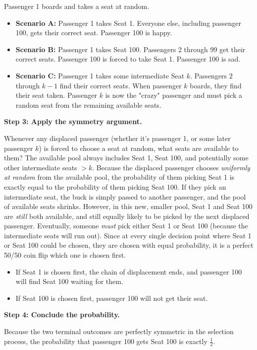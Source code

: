 \begin{solution}
Passenger 1 boards and takes a seat at random.
\begin{itemize}
    \item \textbf{Scenario A:} Passenger 1 takes Seat 1. Everyone else, including passenger 100, gets their correct seat. Passenger 100 is happy.
    \item \textbf{Scenario B:} Passenger 1 takes Seat 100. Passengers 2 through 99 get their correct seats. Passenger 100 is forced to take Seat 1. Passenger 100 is sad.
    \item \textbf{Scenario C:} Passenger 1 takes some intermediate Seat $k$. Passengers $2$ through $k-1$ find their correct seats. When passenger $k$ boards, they find their seat taken. Passenger $k$ is now the "crazy" passenger and must pick a random seat from the remaining available seats.
\end{itemize}

\textbf{Step 3: Apply the symmetry argument.}

Whenever any displaced passenger (whether it's passenger 1, or some later passenger $k$) is forced to choose a seat at random, what seats are available to them?
The available pool always includes Seat 1, Seat 100, and potentially some other intermediate seats $>k$.
Because the displaced passenger chooses \textit{uniformly at random} from the available pool, the probability of them picking Seat 1 is exactly equal to the probability of them picking Seat 100.
If they pick an intermediate seat, the buck is simply passed to another passenger, and the pool of available seats shrinks. However, in this new, smaller pool, Seat 1 and Seat 100 are \textit{still} both available, and still equally likely to be picked by the next displaced passenger.
Eventually, someone \textit{must} pick either Seat 1 or Seat 100 (because the intermediate seats will run out).
Since at every single decision point where Seat 1 or Seat 100 could be chosen, they are chosen with equal probability, it is a perfect 50/50 coin flip which one is chosen first.
\begin{itemize}
    \item If Seat 1 is chosen first, the chain of displacement ends, and passenger 100 will find Seat 100 waiting for them.
    \item If Seat 100 is chosen first, passenger 100 will not get their seat.
\end{itemize}

\textbf{Step 4: Conclude the probability.}

Because the two terminal outcomes are perfectly symmetric in the selection process, the probability that passenger 100 gets Seat 100 is exactly $\frac{1}{2}$.
\end{solution}

